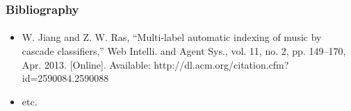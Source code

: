 \documentclass{beamer}
\begin{document}
\begin{frame}[noframenumbering]
    \frametitle{Bibliography}
    \framesubtitle{}
    \begin{itemize}
      \item W. Jiang and Z. W. Ras, “Multi-label automatic indexing of music by cascade classifiers,” Web Intelli. and Agent Sys., vol. 11, no. 2, pp. 149–170, Apr. 2013. [Online]. Available: http://dl.acm.org/citation.cfm?id=2590084.2590088
      \item etc.
    \end{itemize}
\end{frame}

    
\end{document}
